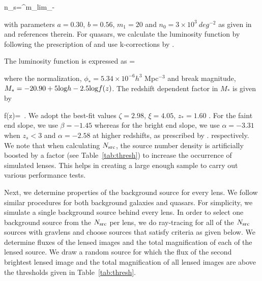 \documentclass[useAMS,usenatbib,a4paper]{mn2e}
\begin{document}
\be
\label{eqn:ns}
n_s=\int^{m_{\rm lim}}_{-\infty} 
\ee

with parameters $a=0.30$, $b=0.56$, $m_1=20$ and $n_0=3\times10^3~deg^{-2}$ as
given in \citep{Faure2009} and references therein. For quasars, we calculate
the luminosity function by following the prescription of \citep{Ogur2010} and
use k-corrections by \citep{Richards2006}. 

The luminosity function is expressed as
\be
{}=
\ee

where the normalization, $\phi_{*}=5.34\times10^{-6} h^3$ Mpc$^{-3}$ and break
magnitude, $M_*=-20.90 + 5 {\rm log} h - 2.5 {\rm log} f(z)$. The redshift
dependent factor in $M_*$ is given by

\be
f(z)= \,.
\ee
We adopt the best-fit values $\zeta=2.98$, $\xi=4.05$, $z_{*}=1.60$
\citep{Oguri2010}. For the faint end slope, we use $\beta=-1.45$ whereas for
the bright end slope, we use $\alpha=-3.31$ when $z_s<3$ and $\alpha=-2.58$ at
higher redshifts, as prescribed by \citep{Oguri2010}. 
respectively. We note that when calculating $N_{\rm src}$, the source
number density is artificially boosted by a factor (see Table~\ref{tab:thresh})
to increase the occurrence of simulated lenses. This helps in creating a large
enough sample to carry out various performance tests.

Next, we determine properties of the background source for every lens. We follow
similar procedures for both background galaxies and quasars. For simplicity, we
simulate a single background source behind every lens. In order to select one
background source from the $N_{\rm src}$ per lens, we do ray-tracing for all of the
$N_{\rm src}$ sources with {\sc gravlens} \citep{Keeton2000} and choose sources that
satisfy criteria as given below. We determine fluxes of the lensed images
and the total magnification of each of the lensed source. We draw a random
source for which the flux of the second brightest lensed image and the total
magnification of all lensed images are above the thresholds given in
Table~\ref{tab:thresh}.
\end{document}
